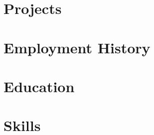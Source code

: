 \documentclass[9pt]{resume}
\begin{document}
\maketitle

\section{Projects}






\section{Employment History}










\section{Education}




\section{Skills}









\end{document}
